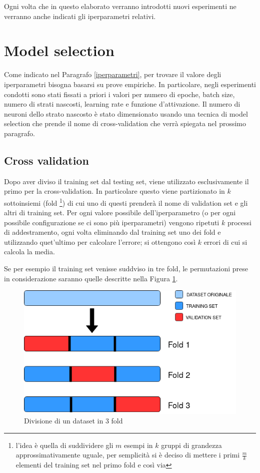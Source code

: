 \documentclass[12pt]{report}
\begin{document}
Ogni volta che in questo elaborato verranno introdotti nuovi esperimenti ne verranno anche indicati gli iperparametri relativi.

\section{Model selection}\label{modelselection}
Come indicato nel Paragrafo \ref{iperparametri}, per trovare il valore degli iperparametri bisogna basarsi su prove empiriche. In particolare, negli esperimenti condotti sono stati fissati a priori i valori per numero di epoche, batch size, numero di strati nascosti, learning rate e funzione d'attivazione. Il numero di neuroni dello strato nascosto è stato dimensionato usando una tecnica di model selection che prende il nome di cross-validation che verrà spiegata nel prossimo paragrafo.

\subsection{Cross validation}\label{crossvalidation}
Dopo aver diviso il training set dal testing set, viene utilizzato esclusivamente  il primo per la cross-validation. In particolare questo viene partizionato in $k$ sottoinsiemi (fold \footnote{l'idea è quella di suddividere gli $m$ esempi in $k$ gruppi di grandezza approssimativamente uguale, per semplicità si è deciso di mettere i primi $\frac{m}{k}$ elementi del training set nel primo fold e così via}) di cui uno di questi prenderà il nome di validation set e gli altri di training set. Per ogni valore possibile dell'iperparametro (o per ogni possibile configurazione se ci sono più iperparametri) vengono ripetuti $k$ processi di addestramento, ogni volta eliminando dal training set uno dei fold e utilizzando quet'ultimo per calcolare l'errore; si ottengono così $k$ errori di cui si calcola la media.

Se per esempio il training set venisse suddviso in tre fold, le permutazioni prese in considerazione saranno quelle descritte nella Figura \ref{foldDiagram}.

\begin{figure}[H]
\begin{center}
\includegraphics[scale=0.45]{foldDiagram.png}
\caption{Divisione di un dataset in 3 fold}
\label{foldDiagram}
\end{center}
\end{figure}
\end{document}
